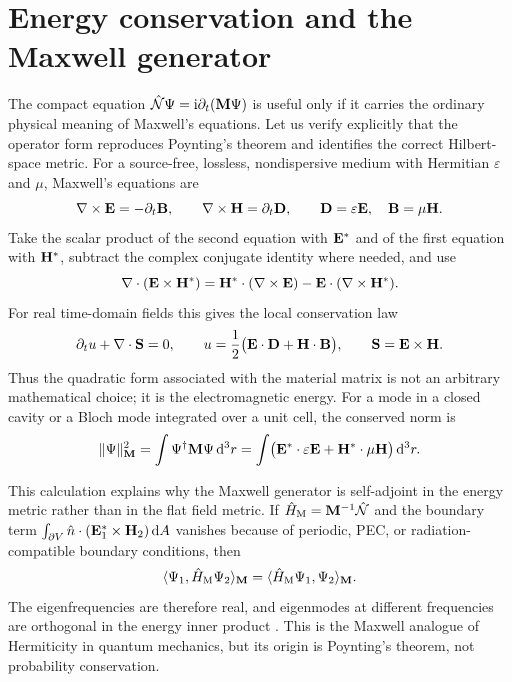\section{Energy conservation and the Maxwell generator}
\label{sec:ch2-energy-generator-detail}

The compact equation $\hat{\mathcal{N}}\Psi=\mathrm{i}\partial_t(\mathbf{M}\Psi)$ is useful
only if it carries the ordinary physical meaning of Maxwell's
equations.  Let us verify explicitly that the operator form reproduces
Poynting's theorem and identifies the correct Hilbert-space metric.
For a source-free, lossless, nondispersive medium with Hermitian
$\varepsilon$ and $\mu$, Maxwell's equations are
\begin{equation}\label{eq:ch2-time-domain-maxwell-pair}
  \nabla\times\mathbf{E}=-\partial_t\mathbf{B},
  \qquad
  \nabla\times\mathbf{H}=\partial_t\mathbf{D},
  \qquad
  \mathbf{D}=\varepsilon\mathbf{E},
  \quad
  \mathbf{B}=\mu\mathbf{H}.
\end{equation}
Take the scalar product of the second equation with $\mathbf{E}^*$ and
of the first equation with $\mathbf{H}^*$, subtract the complex conjugate
identity where needed, and use
\begin{equation}\label{eq:ch2-poynting-vector-identity}
  \nabla\cdot(\mathbf{E}\times\mathbf{H}^*)
  = \mathbf{H}^*\cdot(\nabla\times\mathbf{E})
    -\mathbf{E}\cdot(\nabla\times\mathbf{H}^*).
\end{equation}
For real time-domain fields this gives the local conservation law
\begin{equation}\label{eq:ch2-poynting-theorem-local}
  \partial_t u + \nabla\cdot\mathbf{S} =0,
  \qquad
  u=\frac{1}{2}\bigl(\mathbf{E}\cdot\mathbf{D}+
  \mathbf{H}\cdot\mathbf{B}\bigr),
  \qquad
  \mathbf{S}=\mathbf{E}\times\mathbf{H}.
\end{equation}
Thus the quadratic form associated with the material matrix is not an
arbitrary mathematical choice; it is the electromagnetic energy.  For a
mode in a closed cavity or a Bloch mode integrated over a unit cell, the
conserved norm is
\begin{equation}\label{eq:ch2-conserved-maxwell-norm}
  \|\Psi\|^2_{\mathbf{M}}
  = \int \Psi^\dagger\mathbf{M}\Psi\,\mathrm{d}^3r
  = \int \bigl(\mathbf{E}^*\cdot\varepsilon\mathbf{E}
  +\mathbf{H}^*\cdot\mu\mathbf{H}\bigr)\,\mathrm{d}^3r.
\end{equation}

This calculation explains why the Maxwell generator is self-adjoint in
the energy metric rather than in the flat field metric.  If
$\hat{H}_{\mathrm{M}}=\mathbf{M}^{-1}\hat{\mathcal{N}}$ and the boundary term
$\int_{\partial V}\hat{n}\cdot(\mathbf{E}_1^*\times\mathbf{H}_2)\,\mathrm{d} A$
vanishes because of periodic, PEC, or radiation-compatible boundary
conditions, then
\begin{equation}\label{eq:ch2-generator-selfadjoint}
  \langle \Psi_1,\hat{H}_{\mathrm{M}}\Psi_2\rangle_{\mathbf{M}}
  =\langle \hat{H}_{\mathrm{M}}\Psi_1,\Psi_2\rangle_{\mathbf{M}}.
\end{equation}
The eigenfrequencies are therefore real, and eigenmodes at different
frequencies are orthogonal in the energy inner product
\cite{raghu2008analogs}.  This is the
Maxwell analogue of Hermiticity in quantum mechanics, but its origin is
Poynting's theorem, not probability conservation.

